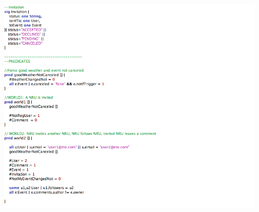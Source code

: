\documentclass[12pt]{book}
\begin{document}
\includegraphics[width=19cm,height=21cm]{Alloy3}\\
\newpage
\end{document}
